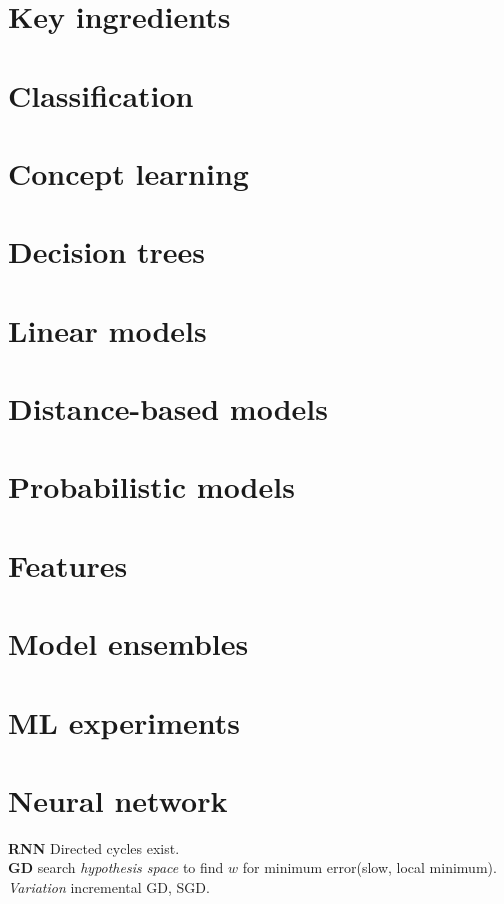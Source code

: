 \documentclass[8pt]{extarticle} %
\begin{document}
\raggedright
\begin{multicols}{3}


\section{Key ingredients}
\lipsum[2-4]
\section{Classification}
\lipsum[2-4]
\section{Concept learning}
\lipsum[2-4]
\section{Decision trees}
\lipsum[2-4]
\section{Linear models}
\lipsum[2-4]
\section{Distance-based models}
\lipsum[1-4]
\section{Probabilistic models}
\lipsum[1-4]
\section{Features}
\lipsum[1-4]
\section{Model ensembles}
\lipsum[1-4]
\section{ML experiments}
\lipsum[1-4]
\section{Neural network}
\textbf{RNN} Directed cycles exist.\\

\textbf{GD} search \textit{hypothesis space} to find $w$ for minimum error(slow, local minimum). \textit{Variation} incremental GD, SGD.\\


\end{multicols}
\end{document}
